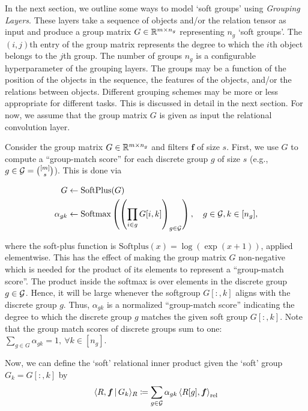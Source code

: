 In the next section, we outline some ways to model `soft groups' using \textit{Grouping Layers}. These layers take a sequence of objects and/or the relation tensor as input and produce a group matrix $G \in \mathbb{R}^{m \times n_g}$ representing $n_g$ `soft groups'. The $(i,j)$th entry of the group matrix represents the degree to which the $i$th object belongs to the $j$th group. The number of groups $n_g$ is a configurable hyperparameter of the grouping layers. The groups may be a function of the position of the objects in the sequence, the features of the objects, and/or the relations between objects. Different grouping schemes may be more or less appropriate for different tasks. This is discussed in detail in the next section. For now, we assume that the group matrix $G$ is given as input the relational convolution layer.

Consider the group matrix $G \in \mathbb{R}^{m \times n_g}$ and filters $\bm{f}$ of size $s$. First, we use $G$ to compute a ``group-match score'' for each discrete group $g$ of size $s$ (e.g., $g \in {\mathcal{G}} = \binom{[m]}{s}$). This is done via

\begin{equation}
    \label{eq:group_match_score}
    \begin{split}
        G &\gets \text{SoftPlus}(G)\\
        \alpha_{gk} &\gets \text{Softmax}\left(\left(\prod_{i \in g} G[i,k]\right)_{g \in {\mathcal{G}}}\right), \quad g \in {\mathcal{G}}, k \in [n_g],
    \end{split}
\end{equation}

where the soft-plus function is $\text{Softplus}(x) = \log(\exp(x + 1))$, applied elementwise. This has the effect of making the group matrix $G$ non-negative which is needed for the product of its elements to represent a ``group-match score''. The product inside the softmax is over elements in the discrete group $g \in {\mathcal{G}}$. Hence, it will be large whenever the softgroup $G[:, k]$ aligns with the discrete group $g$. Thus, $\alpha_{gk}$ is a normalized ``group-match score'' indicating the degree to which the discrete group $g$ matches the given soft group $G[:,k]$. Note that the group match scores of discrete groups sum to one: $\sum_{g \in G} \alpha_{gk} = 1, \ \forall k \in [n_g]$.

Now, we can define the `soft' relational inner product given the `soft' group $G_k = G[:, k]$ by
\begin{equation}
    \label{eq:soft_relational_inner_prod}
    \langle R, \boldsymbol{f} \, \vert \, G_k \rangle_R \coloneqq \sum_{g \in {\mathcal{G}}} \alpha_{gk} \left \langle R[g], \boldsymbol{f} \right\rangle_\mathrm{rel}
\end{equation}

